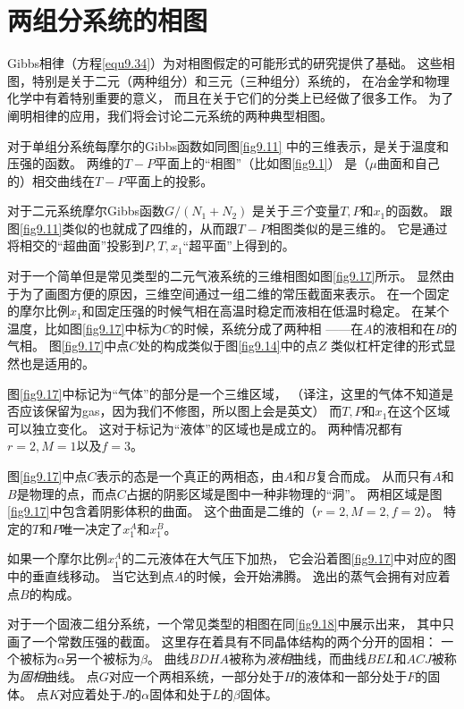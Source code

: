 \section{两组分系统的相图}
\label{sec9.7}

Gibbs相律（方程\eqref{equ9.34}）为对相图假定的可能形式的研究提供了基础。
这些相图，特别是关于二元（两种组分）和三元（三种组分）系统的，
在冶金学和物理化学中有着特别重要的意义，
而且在关于它们的分类上已经做了很多工作。
为了阐明相律的应用，我们将会讨论二元系统的两种典型相图。

对于单组分系统每摩尔的Gibbs函数如同图\ref{fig9.11}
中的三维表示，是关于温度和压强的函数。
两维的$T-P$平面上的“相图”（比如图\ref{fig9.1}）
是（$\mu$曲面和自己的）相交曲线在$T-P$平面上的投影。

对于二元系统摩尔Gibbs函数$G/(N_1+N_2)$
是关于{\it 三个}变量$T,P$和$x_1$的函数。
跟图\ref{fig9.11}类似的也就成了四维的，从而跟$T-P$相图类似的是三维的。
它是通过将相交的“超曲面”投影到$P,T,x_1$“超平面”上得到的。

对于一个简单但是常见类型的二元气液系统的三维相图如图\ref{fig9.17}所示。
显然由于为了画图方便的原因，三维空间通过一组二维的常压截面来表示。
在一个固定的摩尔比例$x_1$和固定压强的时候气相在高温时稳定而液相在低温时稳定。
在某个温度，比如图\ref{fig9.17}中标为$C$的时候，系统分成了两种相
——在$A$的液相和在$B$的气相。
图\ref{fig9.17}中点$C$处的构成类似于图\ref{fig9.14}中的点$Z$
类似杠杆定律的形式显然也是适用的。

图\ref{fig9.17}中标记为“气体”的部分是一个三维区域，
（译注，这里的气体不知道是否应该保留为gas，因为我们不修图，所以图上会是英文）
而$T,P$和$x_1$在这个区域可以独立变化。
这对于标记为“液体”的区域也是成立的。
两种情况都有$r=2,M=1$以及$f=3$。

图\ref{fig9.17}中点$C$表示的态是一个真正的两相态，由$A$和$B$复合而成。
从而只有$A$和$B$是物理的点，而点$C$占据的阴影区域是图中一种非物理的“洞”。
两相区域是图\ref{fig9.17}中包含着阴影体积的曲面。
这个曲面是二维的（$r=2,M=2,f=2$）。
特定的$T$和$P$唯一决定了$x_1^A$和$x_1^B$。

如果一个摩尔比例$x_1^A$的二元液体在大气压下加热，
它会沿着图\ref{fig9.17}中对应的图中的垂直线移动。
当它达到点$A$的时候，会开始沸腾。
逸出的蒸气会拥有对应着点$B$的构成。

对于一个固液二组分系统，一个常见类型的相图在同\ref{fig9.18}中展示出来，
其中只画了一个常数压强的截面。
这里存在着具有不同晶体结构的两个分开的固相：
一个被标为$\alpha$另一个被标为$\beta$。
曲线$BDHA$被称为{\it 液相}曲线，而曲线$BEL$和$ACJ$被称为{\it 固相}曲线。
点$G$对应一个两相系统，一部分处于$H$的液体和一部分处于$F$的固体。
点$K$对应着处于$J$的$\alpha$固体和处于$L$的$\beta$固体。


